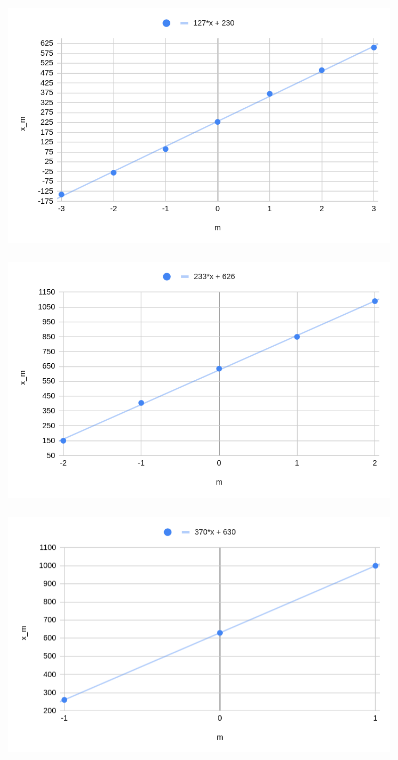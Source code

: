 \documentclass[14pt,a4paper]{article}
\begin{document}
\begin{figure}[H]
    	\centering
    	\includegraphics[width=0.9\textwidth]{Images/plot_1.png}
    	\label{shema1}
    \end{figure}
\begin{figure}[H]
    	\centering
    	\includegraphics[width=0.9\textwidth]{Images/plot_2.png}
    	\label{shema1}
    \end{figure}
\begin{figure}[H]
    	\centering
    	\includegraphics[width=0.9\textwidth]{Images/plot_3.png}
    	\label{shema1}
\end{figure}
\end{document}
